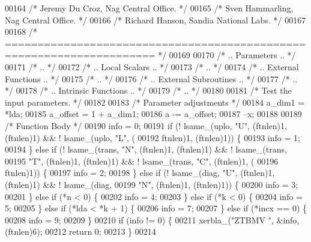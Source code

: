 \begin{DoxyCode}
00164 \textcolor{comment}{/*     Jeremy Du Croz, Nag Central Office. */}
00165 \textcolor{comment}{/*     Sven Hammarling, Nag Central Office. */}
00166 \textcolor{comment}{/*     Richard Hanson, Sandia National Labs. */}
00167 
00168 \textcolor{comment}{/*  ===================================================================== */}
00169 
00170 \textcolor{comment}{/*     .. Parameters .. */}
00171 \textcolor{comment}{/*     .. */}
00172 \textcolor{comment}{/*     .. Local Scalars .. */}
00173 \textcolor{comment}{/*     .. */}
00174 \textcolor{comment}{/*     .. External Functions .. */}
00175 \textcolor{comment}{/*     .. */}
00176 \textcolor{comment}{/*     .. External Subroutines .. */}
00177 \textcolor{comment}{/*     .. */}
00178 \textcolor{comment}{/*     .. Intrinsic Functions .. */}
00179 \textcolor{comment}{/*     .. */}
00180 
00181 \textcolor{comment}{/*     Test the input parameters. */}
00182 
00183     \textcolor{comment}{/* Parameter adjustments */}
00184     a\_dim1 = *lda;
00185     a\_offset = 1 + a\_dim1;
00186     a -= a\_offset;
00187     --x;
00188 
00189     \textcolor{comment}{/* Function Body */}
00190     info = 0;
00191     \textcolor{keywordflow}{if} (! lsame\_(uplo, \textcolor{stringliteral}{"U"}, (ftnlen)1, (ftnlen)1) && ! lsame\_(uplo, \textcolor{stringliteral}{"L"}, (
00192         ftnlen)1, (ftnlen)1)) \{
00193     info = 1;
00194     \} \textcolor{keywordflow}{else} \textcolor{keywordflow}{if} (! lsame\_(trans, \textcolor{stringliteral}{"N"}, (ftnlen)1, (ftnlen)1) && ! lsame\_(trans, 
00195         \textcolor{stringliteral}{"T"}, (ftnlen)1, (ftnlen)1) && ! lsame\_(trans, \textcolor{stringliteral}{"C"}, (ftnlen)1, (
00196         ftnlen)1)) \{
00197     info = 2;
00198     \} \textcolor{keywordflow}{else} \textcolor{keywordflow}{if} (! lsame\_(diag, \textcolor{stringliteral}{"U"}, (ftnlen)1, (ftnlen)1) && ! lsame\_(diag, 
00199         \textcolor{stringliteral}{"N"}, (ftnlen)1, (ftnlen)1)) \{
00200     info = 3;
00201     \} \textcolor{keywordflow}{else} \textcolor{keywordflow}{if} (*n < 0) \{
00202     info = 4;
00203     \} \textcolor{keywordflow}{else} \textcolor{keywordflow}{if} (*k < 0) \{
00204     info = 5;
00205     \} \textcolor{keywordflow}{else} \textcolor{keywordflow}{if} (*lda < *k + 1) \{
00206     info = 7;
00207     \} \textcolor{keywordflow}{else} \textcolor{keywordflow}{if} (*incx == 0) \{
00208     info = 9;
00209     \}
00210     \textcolor{keywordflow}{if} (info != 0) \{
00211     xerbla\_(\textcolor{stringliteral}{"ZTBMV "}, &info, (ftnlen)6);
00212     \textcolor{keywordflow}{return} 0;
00213     \}
00214 

\end{DoxyCode}
